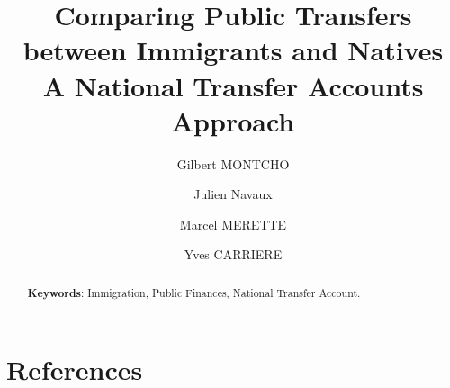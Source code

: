 



\title{Comparing Public Transfers between Immigrants and Natives \\
 \large A National Transfer Accounts Approach}

\author[1]{Gilbert MONTCHO}
\author[3]{Julien Navaux}
\author[2]{Marcel MERETTE}
\author[1]{Yves CARRIERE}



\maketitle
\begin{abstract}
  

  \vspace{0.7em}\par
  \textbf{Keywords}: Immigration, Public Finances, National Transfer Account.
\end{abstract}

\newpage
\tableofcontents

\newpage


\section*{References}
  \printbibliography[heading=none]
